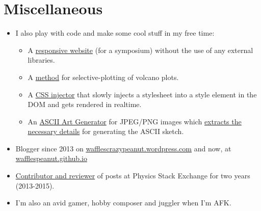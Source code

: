 \documentclass[11pt,a4paper,sans]{moderncv}        %
\newcommand\chref[3][linky]{\href{#2}{\color{#1}#3}}
\begin{document}

\section{Miscellaneous}
\begin{itemize}
\item I also play with code and make some cool stuff in my free time:
\begin{itemize}
\item A \chref{https://github.com/Wafflespeanut/flight-2016}{responsive website} (for a symposium) without the use of any external libraries.
\item A \chref{https://github.com/Wafflespeanut/volcano-min}{method} for selective-plotting of volcano plots.
\item A \chref{https://github.com/Wafflespeanut/AISH}{CSS injector} that slowly injects a stylesheet into a style element in the DOM and gets rendered in realtime.
\item An \chref{https://ascii-gen.herokuapp.com/}{ASCII Art Generator} for JPEG/PNG images which \chref{http://wafflespeanut.github.io/blog/2017/03/01/ascii-sketch/}{extracts the necessary details} for generating the ASCII sketch.
\end{itemize}
\item Blogger since 2013 on \chref{https://wafflescrazypeanut.wordpress.com/}{wafflescrazypeanut.wordpress.com} and now, at \chref{https://wafflespeanut.github.io/}{wafflespeanut.github.io}
\item \chref{https://physics.stackexchange.com/users/11062}{Contributor and reviewer} of posts at Physics Stack Exchange for two years (2013-2015).
\item I'm also an avid gamer, hobby composer and juggler when I'm AFK.
\end{itemize}


\end{document}
